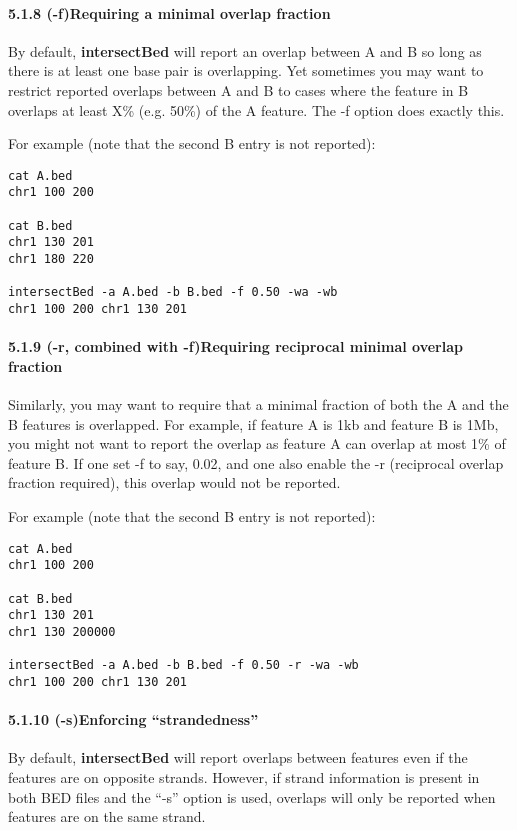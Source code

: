 \documentclass[letterpaper,10pt,english]{sphinxmanual}
\begin{document}
\paragraph{5.1.8 (-f)Requiring a minimal overlap fraction}
\label{content/intersectBed:f-requiring-a-minimal-overlap-fraction}
By default, \textbf{intersectBed} will report an overlap between A and B so long as there is at least one base
pair is overlapping. Yet sometimes you may want to restrict reported overlaps between A and B to cases
where the feature in B overlaps at least X\% (e.g. 50\%) of the A feature. The -f option does exactly
this.

For example (note that the second B entry is not reported):

\begin{Verbatim}[commandchars=\\\{\}]
cat A.bed
chr1 100 200

cat B.bed
chr1 130 201
chr1 180 220

intersectBed -a A.bed -b B.bed -f 0.50 -wa -wb
chr1 100 200 chr1 130 201
\end{Verbatim}


\paragraph{5.1.9 (-r, combined with -f)Requiring reciprocal minimal overlap fraction}
\label{content/intersectBed:r-combined-with-f-requiring-reciprocal-minimal-overlap-fraction}
Similarly, you may want to require that a minimal fraction of both the A and the B features is
overlapped. For example, if feature A is 1kb and feature B is 1Mb, you might not want to report the
overlap as feature A can overlap at most 1\% of feature B. If one set -f to say, 0.02, and one also
enable the -r (reciprocal overlap fraction required), this overlap would not be reported.

For example (note that the second B entry is not reported):

\begin{Verbatim}[commandchars=\\\{\}]
cat A.bed
chr1 100 200

cat B.bed
chr1 130 201
chr1 130 200000

intersectBed -a A.bed -b B.bed -f 0.50 -r -wa -wb
chr1 100 200 chr1 130 201
\end{Verbatim}


\paragraph{5.1.10 (-s)Enforcing ``strandedness''}
\label{content/intersectBed:s-enforcing-strandedness}
By default, \textbf{intersectBed} will report overlaps between features even if the features are on opposite
strands. However, if strand information is present in both BED files and the ``-s'' option is used, overlaps
will only be reported when features are on the same strand.
\end{document}
